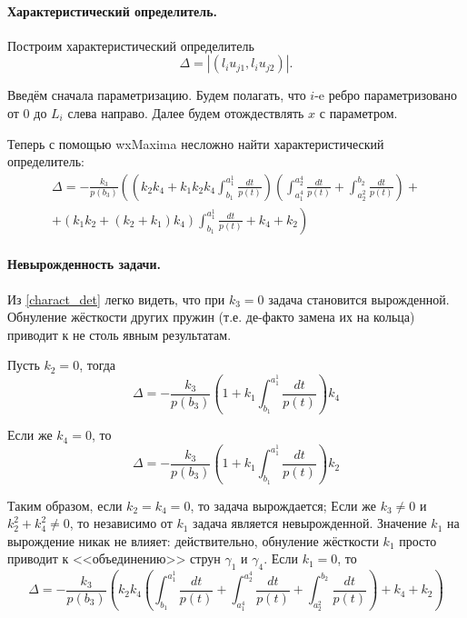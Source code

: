 \documentclass[a4paper,12pt]{article} %
\begin{document}
\paragraph{Характеристический определитель.}
Построим характеристический определитель
\begin{equation}
	\Delta = | (l_i u_{j1}, l_i u_{j2})|.
\end{equation}

Введём сначала параметризацию.
Будем полагать, что $i$-e ребро параметризовано от 0 до $L_i$ слева направо.
Далее будем отождествлять $x$ с параметром.



Теперь с помощью wxMaxima несложно найти характеристический определитель:
\begin{multline}\label{charact_det}
	\Delta =
	-\frac{k_3}{p(b_3)}
	\left(
		\left( k_2 k_4+k_1 k_2 k_4 \int_{b_1}^{a_1^1}\frac{dt}{p(t)}\right)  \left( \int_{a_1^4}^{a_2^4}\frac{dt}{p(t)}+\int_{a_2^2}^{b_2}\frac{dt}{p(t)}\right)
		\right. +\\+ \left.
		\left( k_1 k_2+\left( k_2+k_1\right)  k_4\right)  \int_{b_1}^{a_1^1}\frac{dt}{p(t)}+k_4+k_2
	\right)
\end{multline}

\paragraph{Невырожденность задачи.}
Из \eqref{charact_det} легко видеть,
что при $k_3 = 0$ задача становится вырожденной.
Обнуление жёсткости других пружин (т.е. де-факто замена их на кольца)
приводит к не столь явным результатам.

Пусть $k_2 = 0$, тогда
\begin{equation}
	\Delta = - \frac{k_3}{p(b_3)} \left( 1+k_1 \int_{b_1}^{a_1^1}\frac{dt}{p(t)} \right)  k_4
\end{equation}

Если же $k_4 = 0$, то
\begin{equation}
	\Delta = - \frac{k_3}{p(b_3)} \left( 1+k_1 \int_{b_1}^{a_1^1}\frac{dt}{p(t)} \right)  k_2
\end{equation}

Таким образом, если $k_2 = k_4 = 0$, то задача вырождается;
Если же $k_3 \neq 0$ и $k_2^2+k_4^2 \neq 0$, то независимо от $k_1$ задача является невырожденной.
Значение $k_1$ на вырождение никак не влияет:
действительно, обнуление жёсткости $k_1$ просто приводит к <<объединению>> струн $\gamma_1$ и $\gamma_4$.
Если $k_1=0$, то
\begin{equation}
	\Delta = - \frac{k_3}{p(b_3)} \left(
		k_2 k_4 \left( \int_{b_1}^{a_1^1}\frac{dt}{p(t)}+\int_{a_1^4}^{a_2^4}\frac{dt}{p(t)}+\int_{a_2^2}^{b_2}\frac{dt}{p(t)}\right) +k_4+k_2
	\right)
\end{equation}
\end{document}

